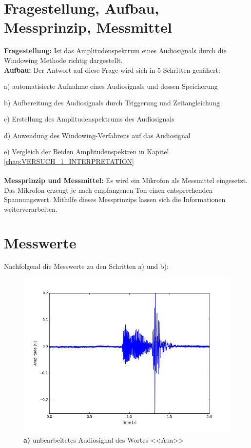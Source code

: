\documentclass[12pt,oneside,a4paper]{report}
\begin{document}
\section{Fragestellung, Aufbau, Messprinzip, Messmittel}
\label{chap:VERSUCH_1_FRAGESTELLUNG}
\textbf{Fragestellung:} Ist das Amplitudenspektrum eines Audiosignals durch die Windowing Methode richtig dargestellt.\\
\textbf{Aufbau:} Der Antwort auf diese Frage wird sich in 5 Schritten genähert:

a) automatisierte Aufnahme eines Audiosignals und dessen Speicherung

b) Aufbereitung des Audiosignals durch Triggerung und Zeitangleichung

c) Erstellung des Amplitudenspektrums des Audiosignals

d) Anwendung des Windowing-Verfahrens  auf das Audiosignal

e) Vergleich der Beiden Amplitudenspektren in Kapitel \ref{chap:VERSUCH_1_INTERPRETATION} \\\\
\textbf{Messprinzip und Messmittel:} Es wird ein Mikrofon als Messmittel eingesetzt. Das Mikrofon erzeugt je nach empfangenen Ton einen entsprechenden Spannungswert. Mithilfe dieses Messprinzips lassen sich die Informationen weiterverarbeiten. 

\section{Messwerte}
\label{chap:VERSUCH_1_MESSWERTE}
Nachfolgend die Messwerte zu den Schritten a) und b):

\begin{figure}[H]
\centering\small
\includegraphics [scale=0.8]{src/v1.png}
\caption{ \textbf{a)} unbearbeitetes Audiosignal des Wortes <<Aua>>}
\label{fig:AUA_unbearbeitet}
\end{figure}
\end{document}
